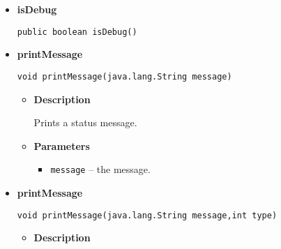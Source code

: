 {{{{{\begin{itemize}
{\begin{itemize}
{Checks, if the start identifier is correct ASCII "Start".
}
\item{
{\bf  Parameters}
  \begin{itemize}
   \item{
\texttt{startIdentifier} -- the identifier.}
  \end{itemize}
}%
\item{{\bf  Returns} -- 
true, if the identifier is correct. 
}%
\end{itemize}
}%
\item{ 
\hypertarget{filetransferUDP.FileTransfer.isDebug()}{{\bf  isDebug}\\}
\begin{lstlisting}[frame=none]
public boolean isDebug()\end{lstlisting} %
}%
\item{ 
\hypertarget{filetransferUDP.FileTransfer.printMessage(java.lang.String)}{{\bf  printMessage}\\}
\begin{lstlisting}[frame=none]
 void printMessage(java.lang.String message)\end{lstlisting} %
\begin{itemize}
\item{
{\bf  Description}

Prints a status message.
}
\item{
{\bf  Parameters}
  \begin{itemize}
   \item{
\texttt{message} -- the message.}
  \end{itemize}
}%
\end{itemize}
}%
\item{ 
\hypertarget{filetransferUDP.FileTransfer.printMessage(java.lang.String, int)}{{\bf  printMessage}\\}
\begin{lstlisting}[frame=none]
 void printMessage(java.lang.String message,int type)\end{lstlisting} %
\begin{itemize}
\item{
{\bf  Description}

}
\end{itemize}}
\end{itemize}}}}}}
